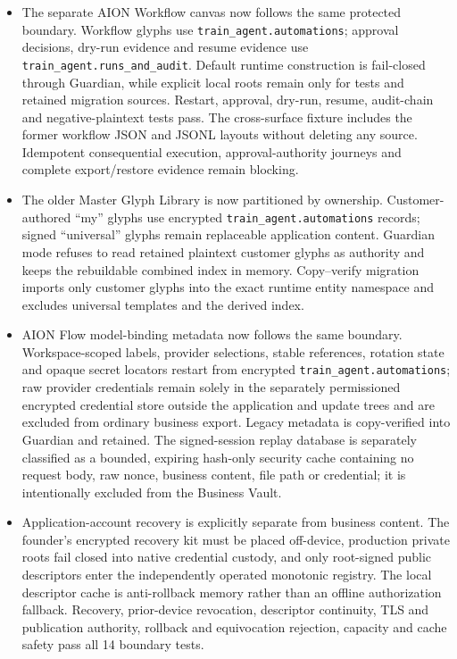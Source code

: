 \documentclass[11pt]{article}
\newcommand{\code}[1]{\texttt{#1}}
\begin{document}
\begin{itemize}
  \item The separate AION Workflow canvas now follows the same protected boundary. Workflow glyphs use \code{train\_agent.automations}; approval decisions, dry-run evidence and resume evidence use \code{train\_agent.runs\_and\_audit}. Default runtime construction is fail-closed through Guardian, while explicit local roots remain only for tests and retained migration sources. Restart, approval, dry-run, resume, audit-chain and negative-plaintext tests pass. The cross-surface fixture includes the former workflow JSON and JSONL layouts without deleting any source. Idempotent consequential execution, approval-authority journeys and complete export/restore evidence remain blocking.
  \item The older Master Glyph Library is now partitioned by ownership. Customer-authored ``my'' glyphs use encrypted \code{train\_agent.automations} records; signed ``universal'' glyphs remain replaceable application content. Guardian mode refuses to read retained plaintext customer glyphs as authority and keeps the rebuildable combined index in memory. Copy--verify migration imports only customer glyphs into the exact runtime entity namespace and excludes universal templates and the derived index.
  \item AION Flow model-binding metadata now follows the same boundary. Workspace-scoped labels, provider selections, stable references, rotation state and opaque secret locators restart from encrypted \code{train\_agent.automations}; raw provider credentials remain solely in the separately permissioned encrypted credential store outside the application and update trees and are excluded from ordinary business export. Legacy metadata is copy-verified into Guardian and retained. The signed-session replay database is separately classified as a bounded, expiring hash-only security cache containing no request body, raw nonce, business content, file path or credential; it is intentionally excluded from the Business Vault.
  \item Application-account recovery is explicitly separate from business content. The founder's encrypted recovery kit must be placed off-device, production private roots fail closed into native credential custody, and only root-signed public descriptors enter the independently operated monotonic registry. The local descriptor cache is anti-rollback memory rather than an offline authorization fallback. Recovery, prior-device revocation, descriptor continuity, TLS and publication authority, rollback and equivocation rejection, capacity and cache safety pass all 14 boundary tests.

\end{itemize}
\end{document}
